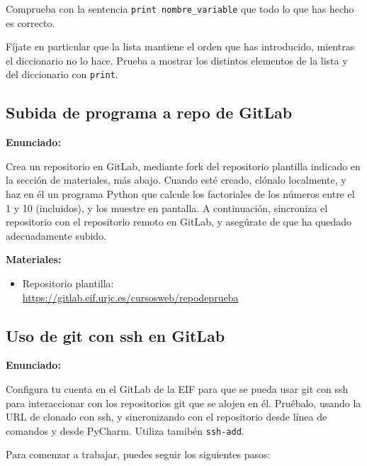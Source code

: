 Comprueba con la sentencia \verb|print nombre_variable| que todo lo
que has hecho es correcto.

Fíjate en particular que la lista mantiene el
orden que has introducido, mientras el diccionario no lo hace. Prueba a mostrar 
los distintos elementos de la lista y del diccionario con \verb|print|.

\subsection{Subida de programa a repo de GitLab}
\label{subsec:practicas-programa-gitlab}

\textbf{Enunciado:}

Crea un repositorio en GitLab, mediante fork del repositorio plantilla indicado en la sección de materiales, más abajo. Cuando esté creado, clónalo localmente, y haz en él un programa Python que calcule los factoriales de los números entre el 1 y 10 (incluidos), y los muestre en pantalla. A continuación, sincroniza el repositorio con el repositorio remoto en GitLab, y asegúrate de que ha quedado adecuadamente subido.

\textbf{Materiales:}

\begin{itemize}
\item Repositorio plantilla: \\
  \url{https://gitlab.eif.urjc.es/cursosweb/repodeprueba}
\end{itemize}

\subsection{Uso de git con ssh en GitLab}
\label{subsec:practicas-programa-gitssh}

\textbf{Enunciado:}

Configura tu cuenta en el GitLab de la EIF para que se pueda usar git con ssh para interaccionar con los repositorios git que se alojen en él. Pruébalo, usando la URL de clonado con ssh, y sincronizando con el repositorio desde línea de comandos y desde PyCharm. Utiliza tamibén \texttt{ssh-add}.

Para comenzar a trabajar, puedes seguir los siguientes pasos:

